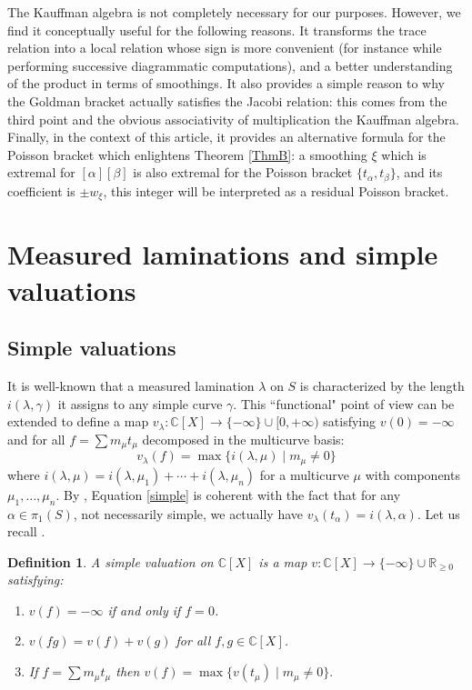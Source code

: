 \documentclass{amsart}
\newtheorem{definition}{Definition}
\newcommand{\C}{\mathbb{C}}
\newcommand{\R}{\mathbb{R}}
\begin{document}
The Kauffman algebra is not completely necessary for our purposes. However, we find it conceptually useful for the following reasons. 
%
It transforms the trace relation into a local relation whose sign is more convenient (for instance while performing successive diagrammatic computations), and a better understanding of the product in terms of smoothings. It also provides a simple reason to why the Goldman bracket actually satisfies the Jacobi relation: this comes from the third point and the obvious associativity of multiplication the Kauffman algebra.
%
Finally, in the context of this article, it provides an alternative formula for the Poisson bracket which enlightens Theorem \ref{ThmB}: a smoothing $\xi$ which is extremal for $[\alpha][\beta]$ is also extremal for the Poisson bracket $\{t_\alpha,t_\beta\}$, and its coefficient is $\pm w_\xi$, this integer will be interpreted as a residual Poisson bracket.


\section{Measured laminations and simple valuations}
\subsection{Simple valuations}

It is well-known that a measured lamination $\lambda$ on $S$ is characterized by the length $i(\lambda,\gamma)$ it assigns to any simple curve $\gamma$. 
%
This ``functional" point of view can be extended to define a map $v_\lambda:\C[X]\to \{-\infty\}\cup [0,+\infty)$
satisfying $v(0)=-\infty$ and for all $f=\sum m_\mu t_\mu$ decomposed in the multicurve basis:
\begin{equation}\label{simple}
v_\lambda(f)=\max\{i(\lambda,\mu) \mid m_\mu\ne 0\}
\end{equation}
where $i(\lambda,\mu)=i(\lambda,\mu_1)+\cdots+i(\lambda,\mu_n)$ for a multicurve $\mu$ with components $\mu_1,\ldots,\mu_n$.
By \cite[Proposition 1.2]{MS_Aut(CV)_2020}, Equation \eqref{simple} is coherent with the fact that for any $\alpha\in \pi_1(S)$, not necessarily simple, we actually have $v_\lambda(t_\alpha)=i(\lambda,\alpha)$. Let us recall \cite[Definition 1.1]{MS_Aut(CV)_2020}.

\begin{definition}\label{defsimple}
A simple valuation on $\C[X]$ is a map $v:\C[X]\to \{-\infty\}\cup \R_{\ge 0}$ satisfying:
\begin{enumerate}
    \item $v(f)=-\infty$ if and only if $f=0$.
    \item $v(fg)=v(f)+v(g)$ for all $f,g\in \C[X]$.
    \item If $f=\sum m_\mu t_\mu$ then $v(f)=\max\{v(t_\mu)\mid m_\mu \ne 0\}.$
\end{enumerate}
\end{definition}
\end{document}
